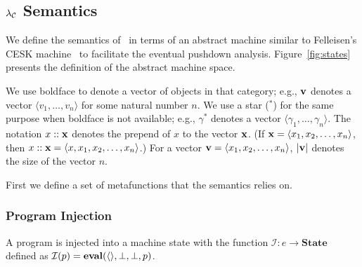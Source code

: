 \newcommand{\letk}[3]{\ntthr{let}{#1}{#2}{#3}}

\newcommand{\impcwk}[2]{\ntthr{imp\mhyphen neg}{\ell}{#1}{#2}}
\newcommand{\impcfk}[1]{\nttwo{imp\mhyphen fun}{\ell}{#1}}
\newcommand{\impcrk}[1]{\nttwo{imp\mhyphen pos}{\ell}{#1}}

\newcommand{\chacwk}[2]{\ntthr{chap\mhyphen neg}{\ell}{#1}{#2}}
\newcommand{\chacfk}[1]{\nttwo{chap\mhyphen fun}{\ell}{#1}}
\newcommand{\chacrk}[1]{\nttwo{chap\mhyphen pos}{\ell}{#1}}

\newcommand{\impblame}[1]{\ensuremath{\mathrm{imp\mhyphen blame}(#1)}}
\newcommand{\chablame}[1]{\ensuremath{\mathrm{cha\mhyphen blame}(#1)}}
\newcommand{\blame}[1]{\ensuremath{\mathrm{blame}(#1)}}
\newcommand{\noblame}[0]{\ensuremath{\mathrm{empty\mhyphen blame}}}

\newcommand{\rr}{\longrightarrow}
\newcommand{\rrs}{\longrightarrow^{*}}

\subsection{$\lambda_{\mathcal{C}}$ Semantics}

We define the semantics of \chapcalc\ in terms of an abstract machine similar to Felleisen's CESK machine~\cite{felleisen1987calculus} to facilitate the eventual pushdown analysis.
Figure~\ref{fig:states} presents the definition of the abstract machine space.

We use boldface to denote a vector of objects in that category; e.g., $\mathbf{v}$ denotes a vector $\langle v_1,\dots,v_n\rangle$ for some natural number $n$.
We use a star ($^*$) for the same purpose when boldface is not available; e.g., $\gamma^*$ denotes a vector $\langle\gamma_1,\dots,\gamma_n\rangle$.
The notation $x::\mathbf{x}$ denotes the prepend of $x$ to the vector $\mathbf{x}$.
(If $\mathbf{x}=\langle x_1,x_2,\dots,x_n\rangle$, then $x::\mathbf{x}=\langle x,x_1,x_2,\dots,x_n\rangle$.)
For a vector $\mathbf{v}=\langle x_1, x_2, \dots, x_n\rangle$, $|\mathbf{v}|$ denotes the size of the vector $n$.

First we define a set of metafunctions that the semantics relies on.

\subsubsection{Program Injection}

A program is injected into a machine state with the function $\mathcal{I} : e\rightarrow\mathbf{State}$ defined as $\mathcal{I}(p)=\mathbf{eval}(\langle\rangle,\perp,\perp,p)$.


